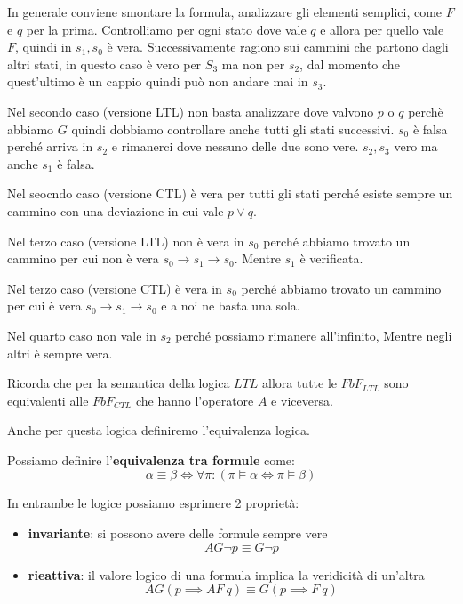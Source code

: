 \begin{esempio} 
    
    In generale conviene smontare la formula, analizzare gli elementi semplici, 
    come $F$ e $q$ per la prima. Controlliamo per ogni stato dove vale $q$ e allora
    per quello vale $F$, quindi in $s_1, s_0$ è vera. Successivamente ragiono
    sui cammini che partono dagli altri stati, in questo caso è vero per $S_3$ ma
    non per $s_2$, dal momento che quest'ultimo è un cappio quindi può non andare
    mai in $s_3$.

    Nel secondo caso (versione LTL) non basta analizzare dove valvono $p$ o $q$ perchè abbiamo $G$
    quindi dobbiamo controllare anche tutti gli stati successivi. $s_0$ è falsa
    perché arriva in $s_2$ e rimanerci dove nessuno delle due sono vere. $s_2,s_3$
    vero ma anche $s_1$ è falsa.

    Nel seocndo caso (versione CTL) è vera per tutti gli stati perché esiste sempre
    un cammino con una deviazione in cui vale $p\lor q$.
    
    Nel terzo caso (versione LTL) non è vera in $s_0$ perché abbiamo trovato un cammino per cui
    non è vera $s_0\to s_1\to s_0$. Mentre $s_1$ è verificata.

    Nel terzo caso (versione CTL) è vera in $s_0$ perché abbiamo trovato un cammino per cui
    è vera $s_0\to s_1\to s_0$ e a noi ne basta una sola.

    Nel quarto caso non vale in $s_2$ perché possiamo rimanere all'infinito, Mentre
    negli altri è sempre vera.
\end{esempio}

\begin{nota}
    Ricorda che per la semantica della logica $LTL$ allora tutte le $FbF_{LTL}$
    sono equivalenti alle $FbF_{CTL}$ che hanno l'operatore $A$ e viceversa.
\end{nota}

Anche per questa logica definiremo l'equivalenza logica.
\begin{definizione}
    Possiamo definire l'\textbf{equivalenza tra formule} come:
    \begin{equation}
        \alpha \equiv \beta \iff \forall \pi : ( \pi \vDash \alpha \iff \pi \vDash 
        \beta)
    \end{equation}
\end{definizione}

In entrambe le logice possiamo esprimere 2 proprietà:
\begin{itemize}
    \item \textbf{invariante}: si possono avere delle formule sempre vere
    \begin{equation}
        AG\lnot p \equiv G\lnot p
    \end{equation}
    \item \textbf{rieattiva}: il valore logico di una formula implica la veridicità
    di un'altra
    \begin{equation}
        AG (p\implies AF \ q) \equiv G(p\implies F \ q)
    \end{equation}
\end{itemize}

